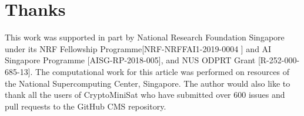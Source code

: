 \documentclass[final]{ieee}
\begin{document}
\section{Thanks}
This work was supported in part by National Research Foundation Singapore under its NRF Fellowship Programme[NRF-NRFFAI1-2019-0004 ] and AI Singapore Programme [AISG-RP-2018-005],  and NUS ODPRT Grant [R-252-000-685-13]. The computational work for this article was performed on resources of the National Supercomputing Center, Singapore\cite{nscc}. The author would also like to thank all the users of CryptoMiniSat who have submitted over 600 issues and pull requests to the GitHub CMS repository\cite{CMS}.




\vfill
\pagebreak
\end{document}
